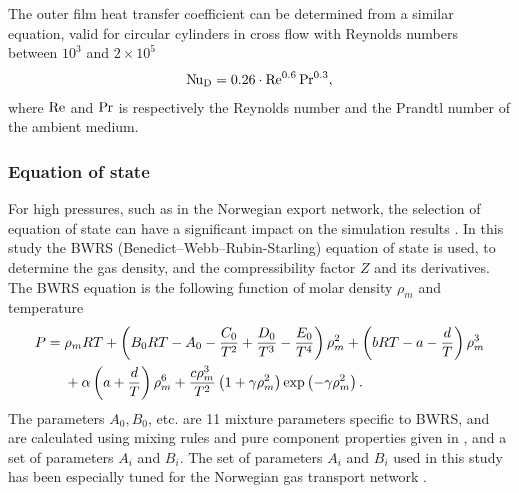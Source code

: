 The outer film heat transfer coefficient can be determined from a similar equation, valid for circular cylinders in cross flow with Reynolds numbers between $10^3$ and $2\times 10^5$ %
\begin{align}
    \operatorname{N\kern-.09em u}_\mathrm{D} = 0.26\cdot\operatorname{R\kern-.04em e}^{0.6}\operatorname{P\kern-.03em r}^{0.3}
, \label{eq:outerFilm}
\end{align}
where $\operatorname{R\kern-.04em e}$ and $\operatorname{P\kern-.03em r}$ is respectively the Reynolds number and the Prandtl number of the ambient medium.

\subsubsection{Equation of state}
For high pressures, such as in the Norwegian export network, the selection of equation of state can have a significant impact on the simulation results \cite{Helgaker2014Validation,Chaczykowski2009Sensitivity}. In this study the BWRS (Benedict–Webb–Rubin-Starling) equation of state \cite{Starling1973Fluid} is used, to determine the gas density, and the compressibility factor $Z$ and its derivatives. The BWRS equation is the following function of molar density $\rho_m$ and temperature
\begin{align}
\begin{split}
    P ={} &\rho_m RT 
    + \del{B_0 RT - A_0 - \frac{C_0}{T^2} + \frac{D_0}{T^3} - \frac{E_0}{T^4}}\rho_m^2 
    + \del{bRT - a - \frac{d}{T}}\rho_m^3 
    \\&
    + \alpha \del{a + \frac{d}{T}}\rho_m^6 
    + \frac{c\rho_m^3}{T^2}\del{1 + \gamma \rho_m^2} \exp\del{-\gamma \rho_m^2}
.
\end{split}
\end{align}
The parameters $A_0, B_0$, etc. are 11 mixture parameters specific to BWRS, and are calculated using mixing rules and pure component properties given in \cite{Starling1973Fluid}, and a set of parameters $A_i$ and $B_i$. %
The set of parameters $A_i$ and $B_i$ used in this study has been especially tuned for the Norwegian gas transport network \cite{Calsep}.

